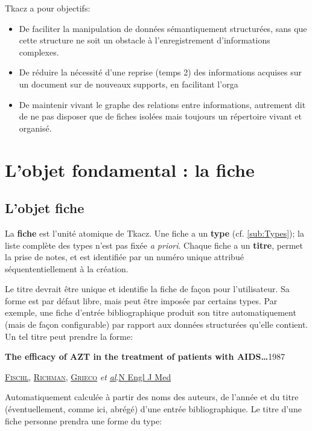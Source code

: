 \documentclass[11pt]{article}
\newcommand\tzcard[1]{%
    \begin{minipage}[t]{1\columnwidth}%
    \begin{shaded}%
    \sffamily #1
    \end{shaded}%
    \end{minipage}
}
\begin{document}
Tkacz a pour objectifs:

\begin{itemize}
\itemsep1pt\parskip0pt
\item
  De faciliter la manipulation de données sémantiquement structurées,
  sans que cette structure ne soit un obstacle à l'enregistrement
  d'informations complexes.
\item
  De réduire la nécessité d'une reprise (temps 2) des informations
  acquises sur un document sur de nouveaux supports, en facilitant
  l'orga
\item
  De maintenir vivant le graphe des relations entre informations,
  autrement dit de ne pas disposer que de fiches isolées mais toujours
  un \og répertoire \fg{} vivant et organisé.
\end{itemize}

\section{L'objet fondamental : la
fiche}\label{lobjet-fondamental-la-fiche}

\subsection{L'objet fiche}\label{lobjet-fiche}

La \textbf{fiche} est l'unité atomique de Tkacz. Une fiche a un
\textbf{type} (cf. \vref{sub:Types}); la liste complète des types n'est
pas fixée \emph{a priori}. Chaque fiche a un \textbf{titre}, permet la
prise de notes, et est identifiée par un numéro unique attribué
séquententiellement à la création.

Le titre devrait être unique et identifie la fiche de façon pour
l'utilisateur. Sa forme est par défaut libre, mais peut être imposée par
certains types. Par exemple, une fiche d'entrée bibliographique produit
son titre automatiquement (mais de façon configurable) par rapport aux
données structurées qu'elle contient. Un tel titre peut prendre la
forme:

\tzcard{\textbf{The efficacy of AZT in the treatment of patients
with AIDS…}\hfill1987

\textsc{\uline{Fischl}}, \textsc{\uline{Richman}}, \textsc{\uline{Grieco}} \textit{et \uline{al}}.\hfill \uline{N
Engl J Med}}

Automatiquement calculée à partir des noms des auteurs, de l'année et du
titre (éventuellement, comme ici, abrégé) d'une entrée bibliographique.
Le titre d'une fiche personne prendra une forme du type:
\end{document}
